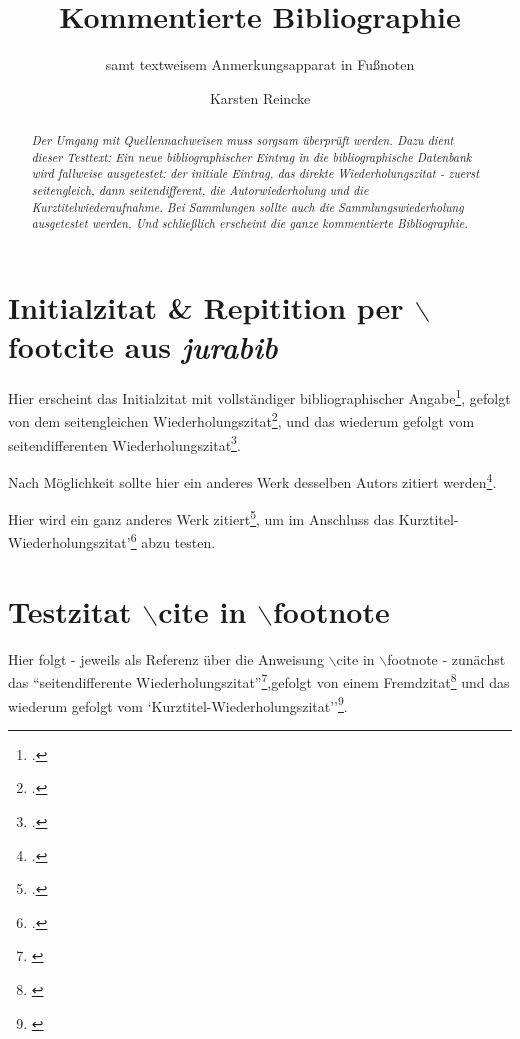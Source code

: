 \documentclass[DIV=calc,BCOR=5mm,11pt,headings=small,oneside,abstract=true, toc=bib]{scrartcl}
\begin{document}
\nocite{*}

\titlehead{Bibliographietest}
\subject{Zum Testen \itshape{neuer bibliographischer Angaben}}
\title{Kommentierte Bibliographie}
\subtitle{samt textweisem Anmerkungsapparat in Fußnoten}
\author{Karsten Reincke}
\maketitle

\begin{abstract}
\noindent \itshape
Der Umgang mit Quellennachweisen muss sorgsam überprüft werden. Dazu dient
dieser Testtext: Ein neue bibliographischer Eintrag in die bibliographische
Datenbank wird fallweise ausgetestet: der initiale Eintrag, das direkte
Wiederholungszitat - zuerst seitengleich, dann seitendifferent, die
Autorwiederholung und die Kurztitelwiederaufnahme. Bei Sammlungen sollte auch
die Sammlungswiederholung ausgetestet werden. Und schließlich erscheint die
ganze kommentierte Bibliographie.
\end{abstract}
\footnotesize
\normalsize

\section{Initialzitat \& Repitition per $\backslash$footcite aus \emph{jurabib}}

Hier erscheint das \glqq Initialzitat mit vollständiger bibliographischer
Angabe\grqq\footcite[vgl. dazu:][123ff]{Covey2006a}, gefolgt von dem
\glqq seitengleichen Wiederholungszitat\grqq\footcite[vgl.
dazu:][123ff]{Covey2006a}, und das wiederum gefolgt vom \glqq seitendifferenten
Wiederholungszitat\grqq\footcite[vgl. dazu:][125f]{Covey2006a}.

Nach Möglichkeit sollte hier ein anderes Werk desselben Autors zitiert
werden\footcite[vgl. dazu:][321]{Covey2006a}.

Hier wird ein ganz anderes Werk zitiert\footcite[vgl.
dazu:][42]{KantKdU1974}, um im Anschluss das \glqq
Kurztitel-Wiederholungszitat'\grqq\footcite[vgl. dazu:][123]{Covey2006a}
abzu testen.

\section{Testzitat $\backslash$cite in $\backslash$footnote}

Hier folgt - jeweils als Referenz über die Anweisung $\backslash$cite in
$\backslash$footnote - zunächst das ``seitendifferente
Wiederholungszitat''\footnote{\cite[vgl. dazu:][125]{Covey2006a}},gefolgt
von einem Fremdzitat\footnote{\cite[vgl. dazu:][42]{KantKdU1974}} und das
wiederum gefolgt vom `Kurztitel-Wiederholungszitat''\footnote{\cite[vgl.
dazu:][125]{Covey2006a}}.


\small

\end{document}
